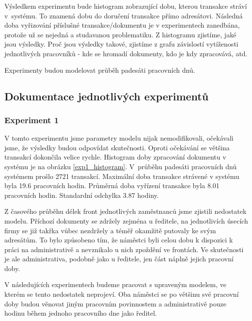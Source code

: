 \documentclass[12pt,a4paper]{article}
\begin{document}
Výsledkem experimentu bude histogram zobrazující dobu, kterou transakce stráví v~sys\-té\-mu. To znamená dobu do doručení transakce přímo adresátovi. Následná doba vy\-ři\-zo\-vá\-ní příslušné transakce/dokumentu je v experimentech zanedbána, protože už se nejedná a studavanou problematiku. Z histogramu zjistíme, jaké jsou výsledky. Proč jsou výsledky takové, zjistíme z grafu závislostí vytíženosti jednotlivých pracovníků - kde se hromadí dokumenty, kdo je kdy zpracovává, atd. 

%
%
%
%

Experimenty budou modelovat průběh padesáti pracovních dnů.

\subsection{Dokumentace jednotlivých experimentů}
\subsubsection{Experiment 1}
V tomto experimentu jsme parametry modelu nijak nemodifikovali, očekávali jsme, že výsledky budou odpovídat skutečnosti.
Oproti očekávání se většina transakcí dokončila velice rychle.
Histogram doby zpracování dokumentu v systému je na obrázku \ref{exp1_histogram}.
V~prů\-bě\-hu padesáti pracovních dnů systémem prošlo 2721 transakcí.
Ma\-xi\-mál\-ní doba trans\-ak\-ce strávené v systému byla 19.6 pracovních hodin.
Průměrná doba vyřízení transakce byla 8.01 pracovních hodin. Standardní odchylka 3.87 hodiny.

Z časového průběhu délek front jednotlivých zaměstnanců jsme zjistili nedostatek mo\-de\-lu.
Příchozí dokumenty se zdržely zejména u ředitele, na jednotlivích úsecích firmy se již takřka vůbec nezdržely a téměř okamžitě putovaly ke svým adresátům.
To bylo způsobeno tím, že náměstci byli celou dobu k dispozici k práci na administrativě a nevznikalo u nich zpoždění ve frontách.
Ve skutečnosti je ale administrativa, podobně jako u ředitele, jen část náplně jejich pracovní doby.

V následujících experimentech budeme pracovat s upraveným modelem, ve kterém se tento nedostatek neprojeví.
Oba náměstci se po většinu své pracovní doby budou věnovat jiným pracovním povinnostem a administrativě  
pouze hodinu během jednoho pracovního dne jako ředitel.
\end{document}
